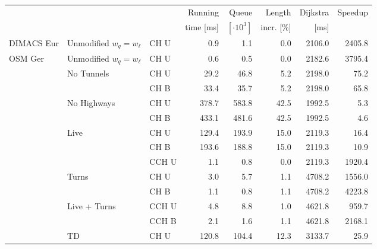 \begin{tabular}{lllrrrrr}
\toprule
 & & &   Running &                Queue &     Length & Dijkstra & Speedup \\ & & & time [ms] & $[\cdot 10^3]$ & incr. [\%] &     [ms] &         \\
\midrule
DIMACS Eur & Unmodified $w_q = w_{\ell}$ & CH U &              0.9 &              1.1 &       0.0 &                    2106.0 &   2405.8 \\
\addlinespace
OSM Ger & Unmodified $w_q = w_{\ell}$ & CH U &              0.6 &              0.5 &       0.0 &                    2182.6 &   3795.4 \\
\addlinespace
        & No Tunnels & CH U &             29.2 &             46.8 &       5.2 &                    2198.0 &     75.2 \\
        &    & CH B &             33.4 &             35.7 &       5.2 &                    2198.0 &     65.8 \\
\addlinespace
        & No Highways & CH U &            378.7 &            583.8 &      42.5 &                    1992.5 &      5.3 \\
        &    & CH B &            433.1 &            481.6 &      42.5 &                    1992.5 &      4.6 \\
\addlinespace
        & Live & CH U &            129.4 &            193.9 &      15.0 &                    2119.3 &     16.4 \\
        &    & CH B &            193.6 &            188.8 &      15.0 &                    2119.3 &     10.9 \\
        &    & CCH U &              1.1 &              0.8 &       0.0 &                    2119.3 &   1920.4 \\
\addlinespace
        & Turns & CH U &              3.0 &              5.7 &       1.1 &                    4708.2 &   1556.0 \\
        &    & CH B &              1.1 &              0.8 &       1.1 &                    4708.2 &   4223.8 \\
\addlinespace
        & Live + Turns & CCH U &              4.8 &              8.8 &       1.0 &                    4621.8 &    959.7 \\
        &    & CCH B &              2.1 &              1.6 &       1.1 &                    4621.8 &   2168.1 \\
\addlinespace
        & TD & CH U &            120.8 &            104.4 &      12.3 &                    3133.7 &     25.9 \\

\end{tabular}
